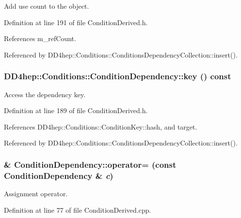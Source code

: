 Add use count to the object. 

Definition at line 191 of file ConditionDerived.h.

References m\_\-refCount.

Referenced by DD4hep::Conditions::ConditionsDependencyCollection::insert().\hypertarget{class_d_d4hep_1_1_conditions_1_1_condition_dependency_a5eb216418c1f020fec66e221a38b9655}{
\subsubsection[{key}]{ DD4hep::Conditions::ConditionDependency::key () const}}
\label{class_d_d4hep_1_1_conditions_1_1_condition_dependency_a5eb216418c1f020fec66e221a38b9655}


Access the dependency key. 

Definition at line 189 of file ConditionDerived.h.

References DD4hep::Conditions::ConditionKey::hash, and target.

Referenced by DD4hep::Conditions::ConditionsDependencyCollection::insert().\hypertarget{class_d_d4hep_1_1_conditions_1_1_condition_dependency_ac1f45d820f6c9dc85e453aa3c3a1cd27}{
\subsubsection[{operator=}]{ \& ConditionDependency::operator= (const {\bf ConditionDependency} \& {\em c})}}
\label{class_d_d4hep_1_1_conditions_1_1_condition_dependency_ac1f45d820f6c9dc85e453aa3c3a1cd27}


Assignment operator. 

Definition at line 77 of file ConditionDerived.cpp.


